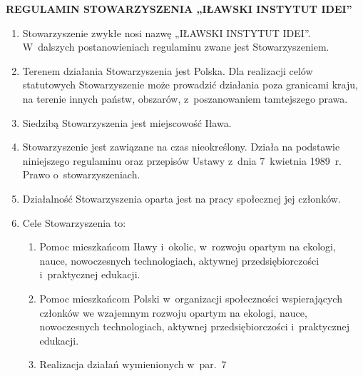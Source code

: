 \documentclass[11pt,a4paper]{article}
\begin{document}
\begin{center}
  {\Large\bfseries REGULAMIN STOWARZYSZENIA „IŁAWSKI INSTYTUT IDEI”}
\end{center}
\vspace{1em}

\begin{enumerate}
  \item Stowarzyszenie zwykłe nosi nazwę „IŁAWSKI INSTYTUT IDEI”. W~dalszych postanowieniach regulaminu zwane jest Stowarzyszeniem.

  \item Terenem działania Stowarzyszenia jest Polska. Dla realizacji celów statutowych Stowarzyszenie może prowadzić działania poza granicami kraju, na terenie innych państw, obszarów, z~poszanowaniem tamtejszego prawa.

  \item Siedzibą Stowarzyszenia jest miejscowość Iława.

  \item Stowarzyszenie jest zawiązane na czas nieokreślony. Działa na podstawie niniejszego regulaminu oraz przepisów Ustawy z~dnia 7~kwietnia 1989~r. Prawo o~stowarzyszeniach.

  \item Działalność Stowarzyszenia oparta jest na pracy społecznej jej członków.

  \item Cele Stowarzyszenia to:
  \begin{enumerate}
    \item Pomoc mieszkańcom Iławy i~okolic, w~rozwoju opartym na ekologi, nauce, nowoczesnych technologiach, aktywnej przedsiębiorczości i~praktycznej edukacji.
    \item Pomoc mieszkańcom Polski w~organizacji społeczności wspierających członków we wzajemnym rozwoju opartym na ekologi, nauce, nowoczesnych technologiach, aktywnej przedsiębiorczości i~praktycznej edukacji.
    \item Realizacja działań wymienionych w~par.~7
  \end{enumerate}


\end{enumerate}
\end{document}
